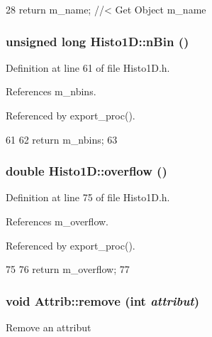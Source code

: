 \begin{DoxyCode}
28 { return m_name; } //< Get Object m_name
\end{DoxyCode}
\hypertarget{classHisto1D_a7f3cf7364ae6e1eb9ba08b5ffe897d8f}{
\subsubsection[{nBin}]{\setlength{\rightskip}{0pt plus 5cm}unsigned long Histo1D::nBin ()}}
\label{classHisto1D_a7f3cf7364ae6e1eb9ba08b5ffe897d8f}


Definition at line 61 of file Histo1D.h.

References m\_\-nbins.

Referenced by export\_\-proc().


\begin{DoxyCode}
61                       {
62     return m_nbins;
63   }
\end{DoxyCode}
\hypertarget{classHisto1D_a5d13018047a4ffb15e662f44a0a3f520}{
\subsubsection[{overflow}]{\setlength{\rightskip}{0pt plus 5cm}double Histo1D::overflow ()}}
\label{classHisto1D_a5d13018047a4ffb15e662f44a0a3f520}


Definition at line 75 of file Histo1D.h.

References m\_\-overflow.

Referenced by export\_\-proc().


\begin{DoxyCode}
75                    {
76     return m_overflow;
77   }
\end{DoxyCode}
\hypertarget{classAttrib_a7d4ef7e32d93cb287792b87b857e79f3}{
\subsubsection[{remove}]{\setlength{\rightskip}{0pt plus 5cm}void Attrib::remove (int {\em attribut})}}
\label{classAttrib_a7d4ef7e32d93cb287792b87b857e79f3}
Remove an attribut 

